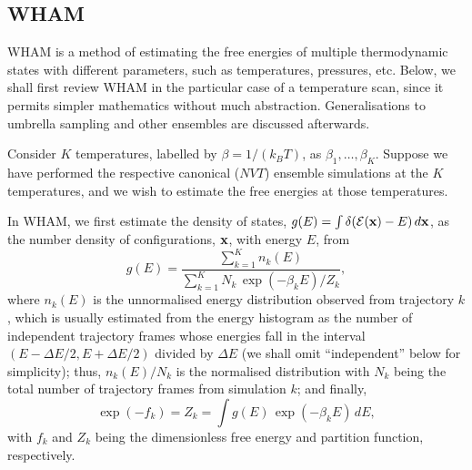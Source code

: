 \documentclass{gMOS2e}
\begin{document}
\subsection{WHAM}



WHAM is a method of
estimating the free energies
of multiple thermodynamic states
with different parameters,
such as temperatures, pressures, etc.
%
%
Below, we shall first review WHAM
in the particular case of a temperature scan,
since it permits simpler mathematics
without much abstraction.
%
Generalisations to umbrella sampling
and other ensembles are discussed
afterwards.





Consider $K$ temperatures,
labelled by
$\beta = 1/(k_B T)$,
as
$\beta_1, \ldots, \beta_K$.
%
Suppose we have performed the respective
canonical ($NVT$) ensemble simulations
at the $K$ temperatures, and
we wish to estimate the free energies
at those temperatures.



In WHAM,
we first estimate the density of states,
$g(E) = \int \delta(\mathcal{E}(\mathbf{x}) - E) \, d\mathbf{x}$,
as the number density of configurations,
$\mathbf{x}$, with energy $E$, from
%
\begin{equation}
g(E)
=
\frac{
  \sum_{k = 1}^K n_k(E)
}
{
  \sum_{k = 1}^K N_k \, \exp(-\beta_k E) / Z_k
},
\label{eq:gE_WHAM}
\end{equation}
%
where
$n_k(E)$
is
the unnormalised energy distribution
observed from trajectory $k$,
which
is usually estimated
from the energy histogram as
the number of independent trajectory frames
whose energies fall in the interval
$(E - \Delta E/2, E + \Delta E/2)$ divided by $\Delta E$
(we shall omit ``independent'' below for simplicity);
%
thus, $n_k(E)/N_k$
is the normalised distribution
with $N_k$ being
the total number of trajectory frames
from simulation $k$;
%
and finally,
%
\begin{equation}
\exp( - f_k )
=
Z_k
=
\int g(E) \, \exp(-\beta_k E) \, dE,
\label{eq:Z}
\end{equation}
with
$f_k$
and
$Z_k$
being
the dimensionless free energy
and
partition function,
respectively.
\end{document}
